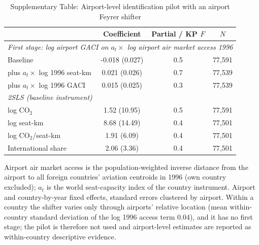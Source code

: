 \begin{table}[htbp]
\centering
\begin{threeparttable}
\caption{Supplementary Table: Airport-level identification pilot with an airport Feyrer shifter}
\label{tab:airport_iv}
\scriptsize
\begin{tabular}{lccc}
\toprule
 & Coefficient & Partial / KP $F$ & $N$ \\
\midrule
\multicolumn{4}{l}{\textit{First stage: log airport GACI on $a_t \times$ log airport air market access 1996}} \\
  Baseline & -0.018 (0.027) & 0.5 & 77,591 \\
  \quad plus $a_t \times$ log 1996 seat-km & 0.021 (0.026) & 0.7 & 77,539 \\
  \quad plus $a_t \times$ log 1996 GACI & 0.015 (0.025) & 0.3 & 77,539 \\
\midrule
\multicolumn{4}{l}{\textit{2SLS (baseline instrument)}} \\
  log CO$_2$ & 1.52 (10.95) & 0.5 & 77,591 \\
  log seat-km & 8.68 (14.49) & 0.4 & 77,501 \\
  log CO$_2$/seat-km & 1.91 (6.09) & 0.4 & 77,501 \\
  International share & 2.06 (3.36) & 0.4 & 77,501 \\
\bottomrule
\end{tabular}
\begin{tablenotes}\scriptsize
\item Airport air market access is the population-weighted inverse distance from the airport to all foreign countries' aviation centroids in 1996 (own country excluded); $a_t$ is the world seat-capacity index of the country instrument. Airport and country-by-year fixed effects, standard errors clustered by airport. Within a country the shifter varies only through airports' relative location (mean within-country standard deviation of the log 1996 access term 0.04), and it has no first stage; the pilot is therefore not used and airport-level estimates are reported as within-country descriptive evidence.
\end{tablenotes}
\end{threeparttable}
\end{table}

